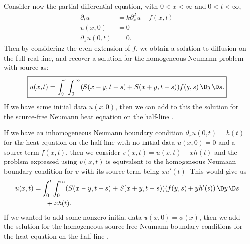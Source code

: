 \begin{node}
\begin{node}\label{pde:heat-000K}%
Consider now the partial differential equation, with $0<x<\infty$ and $0<t<\infty$,
\begin{subequations}
\begin{align}
\partial_{t}u &= k\partial_{x}^{2}u + f(x,t)\\
u(x,0) &= 0\\
\partial_{x}u(0,t) &= 0,
\end{align}
\end{subequations}
Then by considering the even extension of $f$, we obtain a solution to
diffusion on the full real line, and recover a solution for the
homogeneous Neumann problem with source as:
\begin{equation}
\boxed{u(x,t) = \int^{t}_{0}\int^{\infty}_{0}(S(x-y,t-s)+S(x+y,t-s))f(y,s)\,\D y\,\D s.}
\end{equation}
If we have some initial data $u(x,0)$, then we can add to this the
solution for the source-free Neumann heat equation on the half-line
.
\end{node} %

\begin{node}\label{pde:heat-000M}%
If we have an inhomogeneous Neumann boundary condition
$\partial_{x}u(0,t)=h(t)$ for the heat equation on the half-line with no
initial data $u(x,0)=0$ and a source term $f(x,t)$, then we consider
$v(x,t)=u(x,t)-xh(t)$ and the problem expressed using $v(x,t)$ is
equivalent to the homogeneous Neumann boundary condition for $v$ with
its source term being $xh'(t)$. This would give us 
\begin{equation}
\begin{split}
u(x,t) &= \int^{t}_{0}\int^{\infty}_{0}(S(x-y,t-s)+S(x+y,t-s))(f(y,s)+yh'(s))\,\D y\,\D s\\
&\phantom{=}\quad+xh(t).
\end{split}
\end{equation}
If we wanted to add some nonzero initial data $u(x,0)=\phi(x)$, then we add
the solution for the homogeneous source-free Neumann boundary conditions
for the heat equation on the half-line .
\end{node} %


\end{node}
